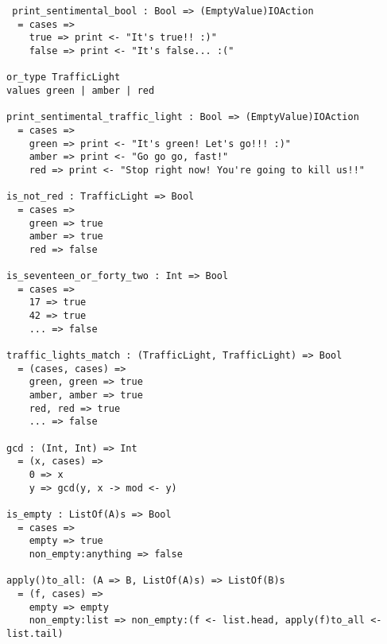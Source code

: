 \documentclass{article}
\begin{document}
\begin{verbatim} print_sentimental_bool : Bool => (EmptyValue)IOAction
  = cases =>
    true => print <- "It's true!! :)"
    false => print <- "It's false... :("

or_type TrafficLight
values green | amber | red

print_sentimental_traffic_light : Bool => (EmptyValue)IOAction
  = cases =>
    green => print <- "It's green! Let's go!!! :)"
    amber => print <- "Go go go, fast!"
    red => print <- "Stop right now! You're going to kill us!!"

is_not_red : TrafficLight => Bool
  = cases =>
    green => true
    amber => true
    red => false

is_seventeen_or_forty_two : Int => Bool
  = cases => 
    17 => true
    42 => true
    ... => false
 
traffic_lights_match : (TrafficLight, TrafficLight) => Bool
  = (cases, cases) =>
    green, green => true
    amber, amber => true
    red, red => true
    ... => false

gcd : (Int, Int) => Int
  = (x, cases) =>
    0 => x
    y => gcd(y, x -> mod <- y) 

is_empty : ListOf(A)s => Bool
  = cases => 
    empty => true
    non_empty:anything => false

apply()to_all: (A => B, ListOf(A)s) => ListOf(B)s
  = (f, cases) =>
    empty => empty
    non_empty:list => non_empty:(f <- list.head, apply(f)to_all <- list.tail)

\end{verbatim}
\end{document}
